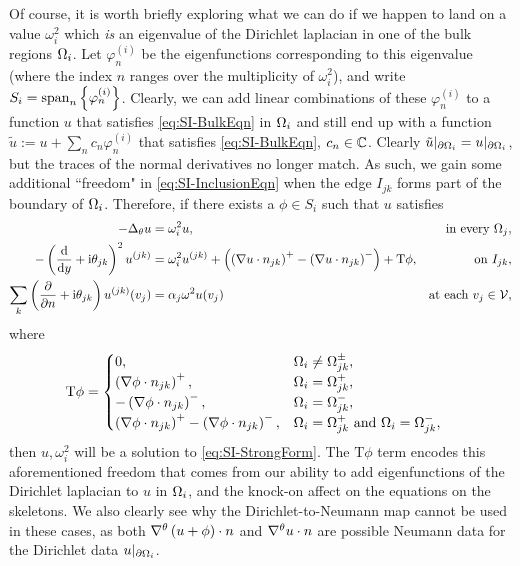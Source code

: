 Of course, it is worth briefly exploring what we can do if we happen to land on a value $\omega_i^2$ which \emph{is} an eigenvalue of the Dirichlet laplacian in one of the bulk regions $\Omega_i$.
Let $\varphi^{(i)}_n$ be the eigenfunctions corresponding to this eigenvalue (where the index $n$ ranges over the multiplicity of $\omega_i^2$), and write $S_i = \mathrm{span}_n\left\{ \varphi^{(i)}_n \right\}$.
Clearly, we can add linear combinations of these $\varphi^{(i)}_n$ to a function $u$ that satisfies \eqref{eq:SI-BulkEqn} in $\Omega_i$ and still end up with a function $\tilde{u} := u + \sum_{n}c_n\varphi^{(i)}_n$ that satisfies \eqref{eq:SI-BulkEqn}, $c_n\in\mathbb{C}$.
Clearly $\tilde{u}\vert_{\partial\Omega_i} = u\vert_{\partial\Omega_i}$, but the traces of the normal derivatives no longer match.
As such, we gain some additional ``freedom" in \eqref{eq:SI-InclusionEqn} when the edge $I_{jk}$ forms part of the boundary of $\Omega_i$.
Therefore, if there exists a $\phi\in S_i$ such that $u$ satisfies
\begin{subequations}
	\begin{align*}
		-\Delta_{\theta}u &= \omega_i^2 u, &\text{in every } \Omega_j, \\
		-\left( \dfrac{\mathrm{d}}{\mathrm{d}y} + \mathrm{i}\theta_{jk} \right)^2u^{(jk)}  
		&= \omega_i^2 u^{(jk)} + \left( \left( \nabla u\cdot n_{jk} \right)^+ - \left( \nabla u\cdot n_{jk} \right)^- \right) + \mathrm{T}\phi,
		&\text{on } I_{jk}, \\
		\sum_{k} \left( \dfrac{\partial }{\partial n}+\mathrm{i}\theta_{jk} \right) u^{(jk)}(v_j) 
		&= \alpha_j\omega^2 u(v_j)
		&\text{at each } v_j\in\mathcal{V},
	\end{align*}
\end{subequations}
where
\begin{align*}
	\mathrm{T}\phi &=
	\begin{cases}
		0, & \Omega_i\neq\Omega_{jk}^{\pm}, \\
		\left( \nabla\phi\cdot n_{jk} \right)^+, & \Omega_i = \Omega_{jk}^+, \\
		-\left( \nabla\phi\cdot n_{jk} \right)^-, & \Omega_i = \Omega_{jk}^-, \\
		\left( \nabla\phi\cdot n_{jk} \right)^+ -\left( \nabla\phi\cdot n_{jk} \right)^-, & \Omega_i = \Omega_{jk}^+ \text{ and } \Omega_i = \Omega_{jk}^-,
	\end{cases}
\end{align*}
then $u, \omega_i^2$ will be a solution to \eqref{eq:SI-StrongForm}.
The $\mathrm{T}\phi$ term encodes this aforementioned freedom that comes from our ability to add eigenfunctions of the Dirichlet laplacian to $u$ in $\Omega_i$, and the knock-on affect on the equations on the skeletons.
We also clearly see why the Dirichlet-to-Neumann map cannot be used in these cases, as both $\nabla^{\theta}\left( u+\phi \right)\cdot n$ and $\nabla^{\theta} u\cdot n$ are possible Neumann data for the Dirichlet data $u\vert_{\partial\Omega_i}$.


